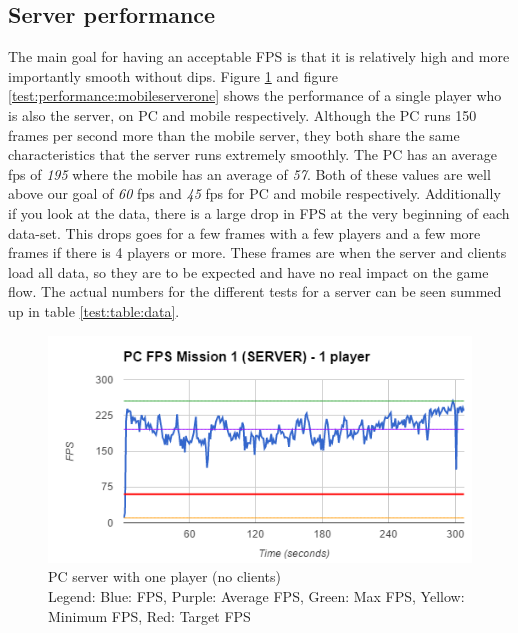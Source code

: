 \subsection*{Server performance}
The main goal for having an acceptable FPS is that it is relatively high and more importantly smooth without dips. Figure \ref{test:performance:pcserverone} and figure \ref{test:performance:mobileserverone} shows the performance of a single player who is also the server, on PC and mobile respectively. Although the PC runs 150 frames per second more than the mobile server, they both share the same characteristics that the server runs extremely smoothly. The PC has an average fps of \emph{195} where the mobile has an average of \emph{57}. Both of these values are well above our goal of \emph{60} fps and \emph{45} fps for PC and mobile respectively. Additionally if you look at the data, there is a large drop in FPS at the very beginning of each data-set. This drops goes for a few frames with a few players and a few more frames if there is 4 players or more. These frames are when the server and clients load all data, so they are to be expected and have no real impact on the game flow. The actual numbers for the different tests for a server can be seen summed up in table \ref{test:table:data}.
\begin{figure}[H]
    \includegraphics[width=\textwidth]{figures/test/PCServerOnePlayer}
    \caption{PC server with one player (no clients) \\ Legend: Blue: FPS, Purple: Average FPS, Green: Max FPS, Yellow: Minimum FPS, Red: Target FPS}
    \label{test:performance:pcserverone}
\end{figure}

